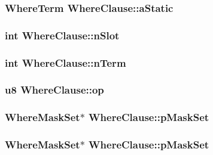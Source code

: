 \subsubsection{\setlength{\rightskip}{0pt plus 5cm}\bf{Where\-Term} \bf{Where\-Clause::a\-Static}}\label{structWhereClause_c1f25d9a0fcc9609b378b84b541e4543}


\subsubsection{\setlength{\rightskip}{0pt plus 5cm}int \bf{Where\-Clause::n\-Slot}}\label{structWhereClause_3c91475220318c2671049033097f0cdb}


\subsubsection{\setlength{\rightskip}{0pt plus 5cm}int \bf{Where\-Clause::n\-Term}}\label{structWhereClause_a051c57ceadb0cc88ec20a1b525fcc94}


\subsubsection{\setlength{\rightskip}{0pt plus 5cm}\bf{u8} \bf{Where\-Clause::op}}\label{structWhereClause_0c763a3a8181381148ee26fa73a52393}


\subsubsection{\setlength{\rightskip}{0pt plus 5cm}\bf{Where\-Mask\-Set}$\ast$ \bf{Where\-Clause::p\-Mask\-Set}}\label{structWhereClause_080cc9551c9f04227ea8f2f9013d5276}


\subsubsection{\setlength{\rightskip}{0pt plus 5cm}\bf{Where\-Mask\-Set}$\ast$ \bf{Where\-Clause::p\-Mask\-Set}}\label{structWhereClause_080cc9551c9f04227ea8f2f9013d5276}


